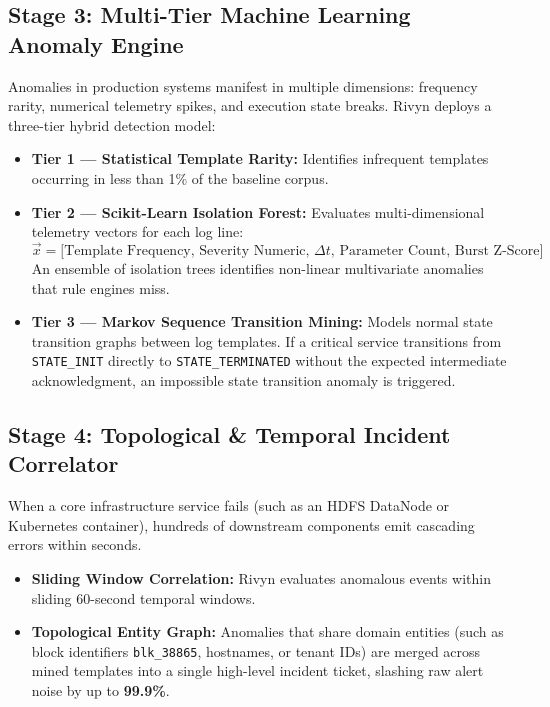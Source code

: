 \documentclass[11pt,a4paper]{article}
\begin{document}
\subsection{Stage 3: Multi-Tier Machine Learning Anomaly Engine}
Anomalies in production systems manifest in multiple dimensions: frequency rarity, numerical telemetry spikes, and execution state breaks. Rivyn deploys a three-tier hybrid detection model:
\begin{itemize}[leftmargin=*]
    \item \textbf{Tier 1 --- Statistical Template Rarity:} Identifies infrequent templates occurring in less than 1\% of the baseline corpus.
    \item \textbf{Tier 2 --- Scikit-Learn Isolation Forest:} Evaluates multi-dimensional telemetry vectors for each log line:
    $$\vec{x} = \big[ \text{Template Frequency},\, \text{Severity Numeric},\, \Delta t,\, \text{Parameter Count},\, \text{Burst Z-Score} \big]$$
    An ensemble of isolation trees identifies non-linear multivariate anomalies that rule engines miss.
    \item \textbf{Tier 3 --- Markov Sequence Transition Mining:} Models normal state transition graphs between log templates. If a critical service transitions from \texttt{STATE\_INIT} directly to \texttt{STATE\_TERMINATED} without the expected intermediate acknowledgment, an impossible state transition anomaly is triggered.
\end{itemize}

\subsection{Stage 4: Topological \& Temporal Incident Correlator}
When a core infrastructure service fails (such as an HDFS DataNode or Kubernetes container), hundreds of downstream components emit cascading errors within seconds. 
\begin{itemize}[leftmargin=*]
    \item \textbf{Sliding Window Correlation:} Rivyn evaluates anomalous events within sliding 60-second temporal windows.
    \item \textbf{Topological Entity Graph:} Anomalies that share domain entities (such as block identifiers \texttt{blk\_38865}, hostnames, or tenant IDs) are merged across mined templates into a single high-level incident ticket, slashing raw alert noise by up to \textbf{99.9\%}.
\end{itemize}
\end{document}
